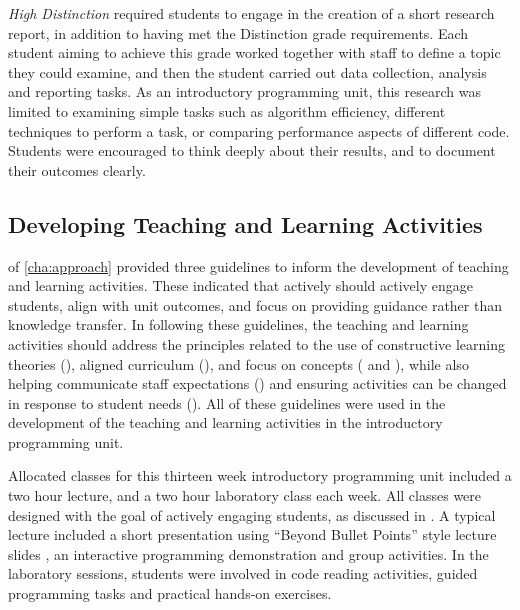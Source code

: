 \emph{High Distinction} required students to engage in the creation of a short research report, in addition to having met the Distinction grade requirements. Each student aiming to achieve this grade worked together with staff to define a topic they could examine, and then the student carried out data collection, analysis and reporting tasks. As an introductory programming unit, this research was limited to examining simple tasks such as algorithm efficiency, different techniques to perform a task, or comparing performance aspects of different code. Students were encouraged to think deeply about their results, and to document their outcomes clearly.


\subsection{Developing Teaching and Learning Activities} %
\label{sub:intro_developing_teaching_and_learning_activities}

 of \cref{cha:approach} provided three guidelines to inform the development of teaching and learning activities. These indicated that actively should actively engage students, align with unit outcomes, and focus on providing guidance rather than knowledge transfer. In following these guidelines, the teaching and learning activities should address the principles related to the use of constructive learning theories (), aligned curriculum (), and focus on concepts ( and ), while also helping communicate staff expectations () and ensuring activities can be changed in response to student needs (). All of these guidelines were used in the development of the teaching and learning activities in the introductory programming unit.

Allocated classes for this thirteen week introductory programming unit included a two hour lecture, and a two hour laboratory class each week. All classes were designed with the goal of actively engaging students, as discussed in . A typical lecture included a short presentation using ``Beyond Bullet Points'' style lecture slides \cite{Atkinson:2007}, an interactive programming demonstration and group activities. In the laboratory sessions, students were involved in code reading activities, guided programming tasks and practical hands-on exercises.

